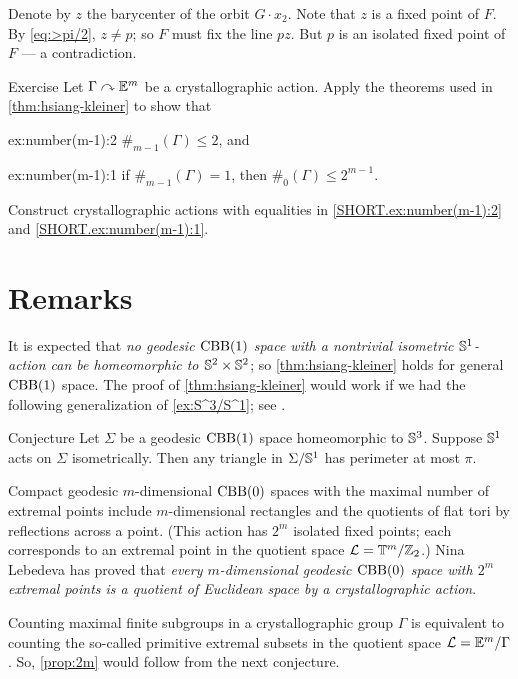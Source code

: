 Denote by $z$ the barycenter of the orbit $G\cdot x_2$.
Note that $z$ is a fixed point of $F$.
By \ref{eq:>pi/2}, $z\ne p$;
so $F$ must fix the line $pz$.
But $p$ is an isolated fixed point of $F$ --- a contradiction.
\qeds

\begin{thm}{Exercise}\label{ex:number(m-1)}
Let $\Gamma\curvearrowright \mathbb{E}^m$ be a crystallographic action.
Apply the theorems used in \ref{thm:hsiang-kleiner} to show that
\begin{subthm}{ex:number(m-1):2}
$\#_{m-1}(\Gamma)\le 2$, and
\end{subthm}

\begin{subthm}{ex:number(m-1):1}
if $\#_{m-1}(\Gamma)=1$, then $\#_0(\Gamma)\le 2^{m-1}$.
\end{subthm}

Construct  crystallographic actions with equalities in \ref{SHORT.ex:number(m-1):2} and \ref{SHORT.ex:number(m-1):1}.
\end{thm}

\section{Remarks}

It is expected that \textit{no geodesic $\mathrm{CBB}(1)$ space with a nontrivial isometric $\mathbb{S}^1$-action can be homeomorphic to $\mathbb{S}^2\times\mathbb{S}^2$};
so \ref{thm:hsiang-kleiner} holds for general $\mathrm{CBB}(1)$ space.
The proof of \ref{thm:hsiang-kleiner} would work if we had the following generalization of \ref{ex:S^3/S^1};
see \cite{harvey-searle}.

\begin{thm}{Conjecture}
Let $\Sigma$ be a geodesic $\mathrm{CBB}(1)$ space homeomorphic to $\mathbb{S}^3$.
Suppose $\mathbb{S}^1$ acts on $\Sigma$ isometrically.
Then any triangle in $\Sigma/\mathbb{S}^1$ has perimeter at most $\pi$.
\end{thm}


Compact geodesic $m$-dimensional $\mathrm{CBB}(0)$ spaces with the maximal number of extremal points include $m$-dimensional rectangles and the quotients of flat tori by reflections across a point.
(This action has $2^m$ isolated fixed points; each corresponds to an extremal point in the quotient space $\mathcal{L}=\mathbb{T}^m/\mathbb{Z}_2$.)
Nina Lebedeva has proved \cite{lebedeva} that \textit{every $m$-dimensional geodesic $\mathrm{CBB}(0)$ space with $2^m$ extremal points is a quotient of Euclidean space by a crystallographic action}.

Counting maximal finite subgroups in a crystallographic group $\Gamma$ is equivalent to counting the so-called primitive extremal subsets in the quotient space $\mathcal{L}=\mathbb{E}^m/\Gamma$.
So, \ref{prop:2m} would follow from the next conjecture.

